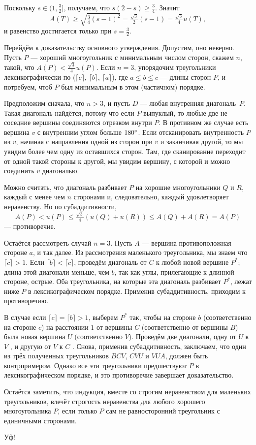 Поскольку $s\in(1,\tfrac32]$, получаем, что $s(2-s)\geqslant \tfrac34$.
Значит 
\[A(T)\ge \sqrt{\tfrac34(s-1)^2}=\tfrac{\sqrt{3}}2(s-1)=\tfrac{\sqrt{3}}4u(T),\]
и равенство достигается только при $s=\tfrac32$.

Перейдём к доказательству основного утверждения.
Допустим, оно неверно.
Пусть $P$ --- хороший многоугольник с минимальным числом сторон, скажем $n$, такой, что $A(P)<\tfrac{\sqrt{3}}4 u(P)$.
Если $n=3$, упорядочим треугольники лексикографически по ($\lceil c\rceil$, $\lceil b\rceil$, $\lceil a\rceil$), где 
$a\leqslant b\leqslant c$ --- длины сторон $P$, и потребуем, чтоб $P$ был минимальным в этом (частичном) порядке.

Предположим сначала, что $n>3$, и пусть $D$ --- любая внутренняя диагональ~$P$.
Такая диагональ найдётся, потому что если $P$ выпуклый, то любые две не соседние вершины соединяются отрезком внутри $P$.
В противном же случае есть вершина $v$ с внутренним углом больше $180\degree$.
Если отсканировать внутренность $P$ из $v$, начиная с направления одной из сторон при $v$ и заканчивая другой,
то мы увидим более чем одну из оставшихся сторон.
Там, где сканирование переходит от одной такой стороны к другой, мы увидим вершину, с которой и можно соединить $v$ диагональю.

Можно считать, что диагональ разбивает $P$ на хорошие многоугольники $Q$ и $R$, каждый с менее чем $n$ сторонами и, следовательно, каждый удовлетворяет неравенству.
Но по субаддитивности, 
\[A(P)<u(P)\leqslant \tfrac{\sqrt{3}}4(u(Q)+u(R))\leqslant A(Q)+A(R)=A(P)\]
--- противоречие.

Остаётся рассмотреть случай $n=3$.
Пусть $A$ --- вершина противоположная стороне $a$, и так далее.
Из рассмотрения маленького треугольника, мы знаем что $\lceil c\rceil>1$.
Если $\lceil b\rceil<\lceil c\rceil$, проведём диагональ от $C$ к любой новой вершине $P^*$;
длина этой диагонали меньше, чем $b$, так как углы, прилегающие к длинной стороне, острые.
Оба треугольника, на которые эта диагональ разбивает $P^*$, лежат ниже $P$ в лексикографическом порядке.
Применив субаддитивность, приходим к противоречию.

В случае если $\lceil c\rceil=\lceil b\rceil>1$, выберем $P^*$ так, чтобы на стороне $b$ (соответственно на стороне $c$) на расстоянии $1$ от вершины $C$ (соответственно от вершины $B$) была новая вершина $U$ (соответственно $V$).
Проведём две диагонали, одну от $U$ к $V$%
, и другую от $V$ к $C$%
.
Снова, применив субаддитивность, заключаем, что один из трёх полученных треугольников $BCV$, $CVU$ и $VUA$, должен быть контрпримером.
Однако все эти треугольники предшествуют $P$ в лексикографическом порядке, и это противоречие завершает доказательство.

Остаётся заметить, что индукция, вместе со строгим неравенством для маленьких треугольников, влечёт строгость неравенства для любого хорошего многоугольника $P$, если только $P$ сам не равносторонний треугольник с единичными сторонами.

Уф!

